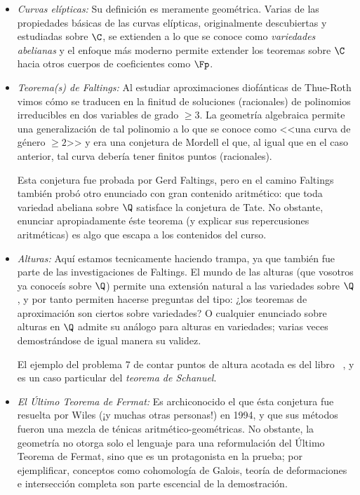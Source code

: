 \documentclass[11pt, reqno]{amsart}
\begin{document}
\begin{itemize}
	\item \textit{Curvas elípticas:}
		Su definición es meramente geométrica. Varias de las propiedades básicas de las curvas elípticas, originalmente descubiertas y estudiadas sobre $\C$,
		se extienden a lo que se conoce como \textit{variedades abelianas} y el enfoque más moderno permite extender los teoremas sobre $\C$ hacia otros
		cuerpos de coeficientes como $\Fp$.
	\item \textit{Teorema(s) de Faltings:}
		Al estudiar aproximaciones diofánticas de Thue-Roth vimos cómo se traducen en la finitud de soluciones (racionales) de polinomios irreducibles en
		dos variables de grado $\ge 3$.
		La geometría algebraica permite una generalización de tal polinomio a lo que se conoce como <<una curva de género $\ge 2$>> y era una conjetura de
		Mordell el que, al igual que en el caso anterior, tal curva debería tener finitos puntos (racionales).

		Esta conjetura fue probada por Gerd Faltings, pero en el camino Faltings también probó otro enunciado con gran contenido aritmético: que toda
		variedad abeliana sobre $\Q$ satisface la conjetura de Tate.
		No obstante, enunciar apropiadamente éste teorema (y explicar sus repercusiones aritméticas) es algo que escapa a los contenidos del curso.
	\item \textit{Alturas:}
		Aquí estamos tecnicamente haciendo trampa, ya que también fue parte de las investigaciones de Faltings.
		El mundo de las alturas (que vosotros ya conoceís sobre $\Q$) permite una extensión natural a las variedades sobre $\Q$, y por tanto
		permiten hacerse preguntas del tipo: ¿los teoremas de aproximación son ciertos sobre variedades? O cualquier enunciado sobre alturas en $\Q$
		admite su análogo para alturas en variedades; varias veces demostrándose de igual manera su validez.

		El ejemplo del problema 7 de contar puntos de altura acotada es del libro \citeauthor{lang:diophantine}~\cite[71-75]{lang:diophantine},
		y es un caso particular del \textit{teorema de Schanuel}.
	\item \textit{El Último Teorema de Fermat:}
		Es archiconocido el que ésta conjetura fue resuelta por Wiles (¡y muchas otras personas!) en 1994, y que sus métodos fueron una mezcla de ténicas
		aritmético-geométricas.
		No obstante, la geometría no otorga solo el lenguaje para una reformulación del Último Teorema de Fermat, sino que es un protagonista en la prueba;
		por ejemplificar, conceptos como cohomología de Galois, teoría de deformaciones e intersección completa son parte escencial de la demostración.
\end{itemize}
\end{document}
